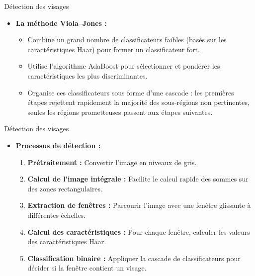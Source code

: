 \documentclass{beamer}
\begin{document}
\begin{frame}{Détection des visages}
    \begin{itemize}
        
        \item \textbf{La méthode Viola–Jones :}  
              \begin{itemize}
                  \item Combine un grand nombre de classificateurs faibles (basés sur les caractéristiques Haar) pour former un classificateur fort.
                  \item Utilise l'algorithme AdaBoost pour sélectionner et pondérer les caractéristiques les plus discriminantes.
                  \item Organise ces classificateurs sous forme d'une cascade : les premières étapes rejettent rapidement la majorité des sous-régions non pertinentes, seules les régions prometteuses passent aux étapes suivantes.
              \end{itemize}
    \end{itemize}
\end{frame}


\begin{frame}{Détection des visages}
    \begin{itemize}
        \item \textbf{Processus de détection :}
              \begin{enumerate}
                  \item \textbf{Prétraitement :} Convertir l'image en niveaux de gris.
                  \item \textbf{Calcul de l'image intégrale :} Facilite le calcul rapide des sommes sur des zones rectangulaires.
                  \item \textbf{Extraction de fenêtres :} Parcourir l'image avec une fenêtre glissante à différentes échelles.
                  \item \textbf{Calcul des caractéristiques :} Pour chaque fenêtre, calculer les valeurs des caractéristiques Haar.
                  \item \textbf{Classification binaire :} Appliquer la cascade de classificateurs pour décider si la fenêtre contient un visage.
              \end{enumerate}
    \end{itemize}
\end{frame}
\end{document}
